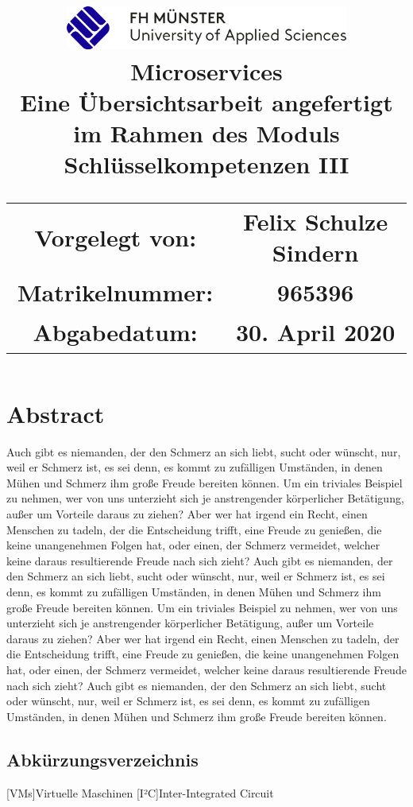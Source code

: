 \documentclass[12pt]{report}
\title{
    {\centering\includegraphics[width=0.7\textwidth]{fh_logo}\newline}\\    
    {Microservices}\\
    {\large Eine Übersichtsarbeit angefertigt im Rahmen des Moduls Schlüsselkompetenzen III}\\
    \vfill
    {
    \begin{tabular}{ c c }
        \small Vorgelegt von: & \small Felix Schulze Sindern \\ 
        \small Matrikelnummer: & \small 965396 \\  
        \small Abgabedatum: & \small 30. April 2020 \\
    \end{tabular}
   
    }
}
\date{} %
\author{} %
\begin{document}
\maketitle

\chapter*{Abstract}
Auch gibt es niemanden, der den Schmerz an sich liebt, sucht oder wünscht, nur, weil er Schmerz ist,
es sei denn, es kommt zu zufälligen Umständen, in denen Mühen und Schmerz ihm große Freude bereiten
können. Um ein triviales Beispiel zu nehmen, wer von uns unterzieht sich je anstrengender körperlicher
Betätigung, außer um Vorteile daraus zu ziehen? Aber wer hat irgend ein Recht, einen Menschen zu
tadeln, der die Entscheidung trifft, eine Freude zu genießen, die keine unangenehmen Folgen hat,
oder einen, der Schmerz vermeidet, welcher keine daraus resultierende Freude nach sich zieht?
Auch gibt es niemanden, der den Schmerz an sich liebt, sucht oder wünscht, nur, weil er Schmerz ist,
es sei denn, es kommt zu zufälligen Umständen, in denen Mühen und Schmerz ihm große Freude bereiten
können. Um ein triviales Beispiel zu nehmen, wer von uns unterzieht sich je anstrengender körperlicher
Betätigung, außer um Vorteile daraus zu ziehen? Aber wer hat irgend ein Recht, einen Menschen zu
tadeln, der die Entscheidung trifft, eine Freude zu genießen, die keine unangenehmen Folgen hat,
oder einen, der Schmerz vermeidet, welcher keine daraus resultierende Freude nach sich zieht? Auch
gibt es niemanden, der den Schmerz an sich liebt, sucht oder wünscht, nur, weil er Schmerz ist, es
sei denn, es kommt zu zufälligen Umständen, in denen Mühen und Schmerz ihm große Freude bereiten
können.

\tableofcontents
\listoffigures
{}
\newpage

\section*{\huge Abkürzungsverzeichnis}
\thispagestyle{plain}
\begin{acronym}
    [VMs]{Virtuelle Maschinen}
    [I²C]{Inter-Integrated Circuit}
\end{acronym}
\end{document}
